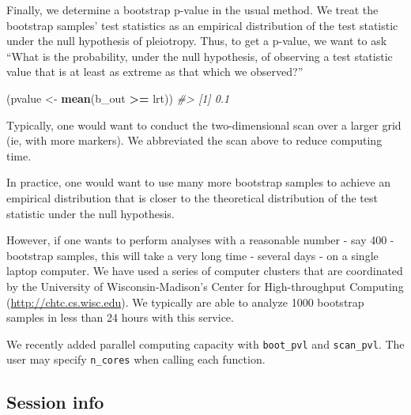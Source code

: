 \documentclass[oneside]{book}
\newenvironment{Shaded}{\begin{snugshade}}{\end{snugshade}}
\newcommand{\CommentTok}[1]{\textcolor[rgb]{0.56,0.35,0.01}{\textit{#1}}}
\newcommand{\KeywordTok}[1]{\textcolor[rgb]{0.13,0.29,0.53}{\textbf{#1}}}
\newcommand{\NormalTok}[1]{#1}
\newcommand{\OperatorTok}[1]{\textcolor[rgb]{0.81,0.36,0.00}{\textbf{#1}}}
\newcommand{\StringTok}[1]{\textcolor[rgb]{0.31,0.60,0.02}{#1}}
\begin{document}
Finally, we determine a bootstrap p-value in the usual method. We treat
the bootstrap samples' test statistics as an empirical distribution of
the test statistic under the null hypothesis of pleiotropy. Thus, to get
a p-value, we want to ask ``What is the probability, under the null
hypothesis, of observing a test statistic value that is at least as
extreme as that which we observed?''

\begin{Shaded}
\begin{Highlighting}[]
\NormalTok{(pvalue <-}\StringTok{ }\KeywordTok{mean}\NormalTok{(b_out }\OperatorTok{>=}\StringTok{ }\NormalTok{lrt))}
\CommentTok{#> [1] 0.1}
\end{Highlighting}
\end{Shaded}

Typically, one would want to conduct the two-dimensional scan over a
larger grid (ie, with more markers). We abbreviated the scan above to
reduce computing time.

In practice, one would want to use many more bootstrap samples to
achieve an empirical distribution that is closer to the theoretical
distribution of the test statistic under the null hypothesis.

However, if one wants to perform analyses with a reasonable number - say
400 - bootstrap samples, this will take a very long time - several days
- on a single laptop computer. We have used a series of computer
clusters that are coordinated by the University of Wisconsin-Madison's
Center for High-throughput Computing (\url{http://chtc.cs.wisc.edu}). We
typically are able to analyze 1000 bootstrap samples in less than 24
hours with this service.

We recently added parallel computing capacity with \texttt{boot\_pvl}
and \texttt{scan\_pvl}. The user may specify \texttt{n\_cores} when
calling each function.

\hypertarget{session-info}{%
\subsection{Session info}\label{session-info-2}}
\end{document}
